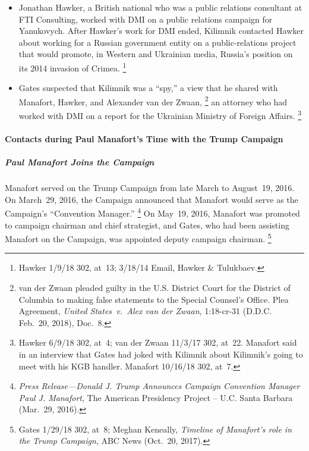\begin{itemize}
    \item Jonathan Hawker, a British national who was a public relations consultant at FTI Consulting, worked with DMI on a public relations campaign for Yanukovych.
    After Hawker's work for DMI ended, Kilimnik contacted Hawker about working for a Russian government entity on a public-relations project that would promote, in Western and Ukrainian media, Russia's position on its 2014 invasion of Crimea.%
\footnote{Hawker 1/9/18 302, at~13;
3/18/14 Email, Hawker \& Tulukbaev.}

    \item Gates suspected that Kilimnik was a ``spy,'' a view that he shared with Manafort, Hawker, and Alexander van der Zwaan,%
\footnote{van der Zwaan pleaded guilty in the U.S. District Court for the District of Columbia to making false statements to the Special Counsel's Office.
Plea Agreement, \textit{United States~v.\ Alex van der Zwaan}, 1:18-cr-31 (D.D.C. Feb.~20, 2018), Doc.~8.}
    an attorney who had worked with DMI on a report for the Ukrainian Ministry of Foreign Affairs.%
\footnote{Hawker 6/9/18 302, at~4;
van der Zwaan 11/3/17 302, at~22.
Manafort said in an interview that Gates had joked with Kilimnik about Kilimnik's going to meet with his KGB handler.
Manafort 10/16/18 302, at~7.}
\end{itemize}


\paragraph{Contacts during Paul Manafort's Time with the Trump Campaign}

\subparagraph{Paul Manafort Joins the Campaign}

Manafort served on the Trump Campaign from late March to August~19, 2016.
On March~29, 2016, the Campaign announced that Manafort would serve as the Campaign's ``Convention Manager.''%
\footnote{\textit{Press Release---Donald J. Trump Announces Campaign Convention Manager Paul J. Manafort}, The American Presidency Project -- U.C. Santa Barbara (Mar.~29, 2016).}
On May~19, 2016, Manafort was promoted to campaign chairman and chief strategist, and Gates, who had been assisting Manafort on the Campaign, was appointed deputy campaign chairman.%
\footnote{Gates 1/29/18 302, at~8; Meghan Keneally, \textit{Timeline of Manafort's role in the Trump Campaign}, ABC News (Oct.~20, 2017).}


